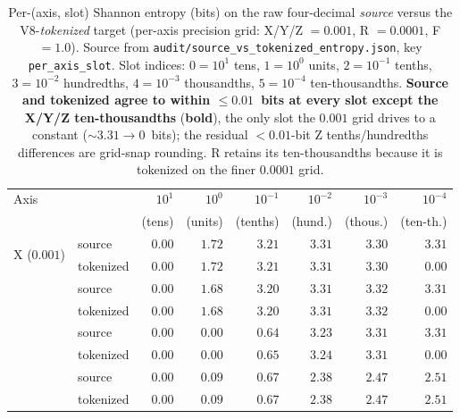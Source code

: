\documentclass[entropy,article,submit,moreauthors,pdftex]{Definitions/mdpi}
\begin{document}
\begin{table}[ht]
\centering
\caption{Per-(axis, slot) Shannon entropy (bits) on the raw four-decimal \emph{source} versus the V8-\emph{tokenized} target (per-axis precision grid: X/Y/Z $=0.001$, R $=0.0001$, F $=1.0$). Source from \texttt{audit/source\_vs\_tokenized\_entropy.json}, key \texttt{per\_axis\_slot}. Slot indices: $0=10^{1}$ tens, $1=10^{0}$ units, $2=10^{-1}$ tenths, $3=10^{-2}$ hundredths, $4=10^{-3}$ thousandths, $5=10^{-4}$ ten-thousandths. \textbf{Source and tokenized agree to within $\le\!0.01$~bits at every slot except the X/Y/Z ten-thousandths} (\textbf{bold}), the only slot the $0.001$ grid drives to a constant ($\sim\!3.31\to0$~bits); the residual $<\!0.01$-bit Z tenths/hundredths differences are grid-snap rounding. R retains its ten-thousandths because it is tokenized on the finer $0.0001$ grid.}
\label{tab:source_vs_tokenized}
\setlength{\tabcolsep}{4pt}
\small
\begin{tabular}{l l r r r r r r}
\toprule
Axis & & $10^{1}$ & $10^{0}$ & $10^{-1}$ & $10^{-2}$ & $10^{-3}$ & $10^{-4}$ \\
& & (tens) & (units) & (tenths) & (hund.) & (thous.) & (ten-th.) \\
\midrule
\multirow{2}{*}{X ($0.001$)} & source    & $0.00$ & $1.72$ & $3.21$ & $3.31$ & $3.30$ & $3.31$ \\
                             & tokenized & $0.00$ & $1.72$ & $3.21$ & $3.31$ & $3.30$ & $\mathbf{0.00}$ \\
\addlinespace[2pt]
\multirow{2}{*}{Y ($0.001$)} & source    & $0.00$ & $1.68$ & $3.20$ & $3.31$ & $3.32$ & $3.31$ \\
                             & tokenized & $0.00$ & $1.68$ & $3.20$ & $3.31$ & $3.32$ & $\mathbf{0.00}$ \\
\addlinespace[2pt]
\multirow{2}{*}{Z ($0.001$)} & source    & $0.00$ & $0.00$ & $0.64$ & $3.23$ & $3.31$ & $3.31$ \\
                             & tokenized & $0.00$ & $0.00$ & $0.65$ & $3.24$ & $3.31$ & $\mathbf{0.00}$ \\
\addlinespace[2pt]
\multirow{2}{*}{R ($0.0001$)} & source    & $0.00$ & $0.09$ & $0.67$ & $2.38$ & $2.47$ & $2.51$ \\
                              & tokenized & $0.00$ & $0.09$ & $0.67$ & $2.38$ & $2.47$ & $2.51$ \\
\bottomrule
\end{tabular}
\end{table}
\end{document}
